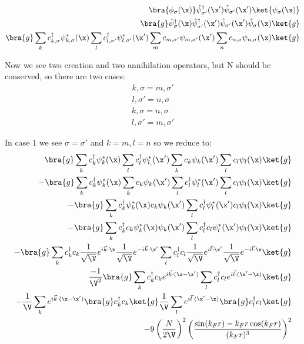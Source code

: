 
\begin{align*}
\bra{\phi_\sigma(\x)}\hat{\psi}_{\sigma'}^\dagger(\x')\hat{\psi}_{\sigma'}(\x')\ket{\psi_\sigma(\x)} \\
\bra{g}\hat{\psi}_\sigma^\dagger(\x)\hat{\psi}_{\sigma'}^\dagger(\x')\hat{\psi}_{\sigma'}(\x')\hat{\psi}_\sigma(\x)\ket{g} \\
\bra{g}\sum_k c_{k,\sigma}^\dagger \psi_{k,\sigma}^\ast(\x) \sum_{l} c_{l,\sigma'}^\dagger \psi_{l,\sigma'}^\ast (\x') \sum_m c_{m,\sigma'} \psi_{m,\sigma'}(\x') \sum_n c_{n,\sigma} \psi_{n,\sigma}(\x) \ket{g}
\end{align*}


Now we see two creation and two annihilation operators, but N should be conserved, so there are two cases:
\begin{equation}
\begin{split}
k,\sigma = m,\sigma' \\
l,\sigma' = n,\sigma
\end{split}
\end{equation}
\begin{equation}
\begin{split}
k,\sigma = n,\sigma \\
l,\sigma' = m,\sigma'
\end{split}
\end{equation}

In case $1$ we see $\sigma = \sigma'$ and $k=m, l=n$ so we reduce to:
\begin{align*}
\bra{g}\sum_k c_{k}^\dagger \psi_{k}^\ast(\x) \sum_{l} c_{l}^\dagger \psi_{l,}^\ast (\x') \sum_k c_{k} \psi_{k}(\x') \sum_l c_{l} \psi_{l}(\x) \ket{g} \\
-\bra{g}\sum_k c_{k}^\dagger \psi_{k}^\ast(\x)  \sum_k c_{k} \psi_{k}(\x') \sum_{l} c_{l}^\dagger \psi_{l}^\ast (\x') \sum_l c_{l} \psi_{l}(\x) \ket{g} \\
-\bra{g}\sum_k c_{k}^\dagger \psi_{k}^\ast(\x) c_{k} \psi_{k}(\x') \sum_{l} c_{l}^\dagger \psi_{l}^\ast (\x') c_{l} \psi_{l}(\x) \ket{g} \\
-\bra{g}\sum_k c_{k}^\dagger c_{k} \psi_{k}^\ast(\x) \psi_{k}(\x') \sum_{l} c_{l}^\dagger  c_{l}\psi_{l}^\ast (\x') \psi_{l}(\x) \ket{g} \\
-\bra{g}\sum_k c_{k}^\dagger c_{k} \frac{1}{\sqrt{\V}} e^{i\vec{k}\cdot\x} \frac{1}{\sqrt{\V}}e^{-i\vec{k}\cdot\x'} \sum_{l} c_{l}^\dagger  c_{l} \frac{1}{\sqrt{\V}}e^{i\vec{l}\cdot\x'} \frac{1}{\sqrt{\V}}e^{-i\vec{l}\cdot\x}\ket{g} \\
\frac{-1}{\V^2}\bra{g}\sum_k c_{k}^\dagger c_{k} e^{i\vec{k}\cdot(\x-\x')} \sum_{l} c_{l}^\dagger  c_{l} e^{i\vec{l}\cdot(\x'-\x)} \ket{g} \\
-\frac{1}{\V}\sum_k e^{i\vec{k}\cdot(\x-\x')} \bra{g} c_{k}^\dagger c_{k} \ket{g} \frac{1}{\V} \sum_l e^{i\vec{l}\cdot(\x'-\x)} \bra{g} c_{l}^\dagger  c_{l} \ket{g} \\
-9\left(\frac{N}{2\V}\right)^2 \left( \frac{\sin(k_Fr) - k_Fr \cos(k_Fr)}{(k_Fr)^3}\right)^2
\end{align*}

